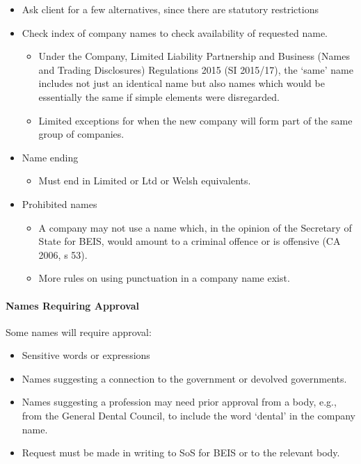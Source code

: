 \documentclass[
]{article}
\providecommand{\tightlist}{%
  \setlength{\itemsep}{0pt}\setlength{\parskip}{0pt}}
\begin{document}
\begin{itemize}
\tightlist
\item
  Ask client for a few alternatives, since there are statutory
  restrictions
\item
  Check index of company names to check availability of requested name.

  \begin{itemize}
  \tightlist
  \item
    Under the Company, Limited Liability Partnership and Business (Names
    and Trading Disclosures) Regulations 2015 (SI 2015/17), the `same'
    name includes not just an identical name but also names which would
    be essentially the same if simple elements were disregarded.
  \item
    Limited exceptions for when the new company will form part of the
    same group of companies.
  \end{itemize}
\item
  Name ending

  \begin{itemize}
  \tightlist
  \item
    Must end in Limited or Ltd or Welsh equivalents.
  \end{itemize}
\item
  Prohibited names

  \begin{itemize}
  \tightlist
  \item
    A company may not use a name which, in the opinion of the Secretary
    of State for BEIS, would amount to a criminal offence or is
    offensive (CA 2006, s 53).
  \item
    More rules on using punctuation in a company name exist.
  \end{itemize}
\end{itemize}

\hypertarget{names-requiring-approval}{%
\paragraph{Names Requiring Approval}\label{names-requiring-approval}}

Some names will require approval:

\begin{itemize}
\tightlist
\item
  Sensitive words or expressions
\item
  Names suggesting a connection to the government or devolved
  governments.
\item
  Names suggesting a profession may need prior approval from a body,
  e.g., from the General Dental Council, to include the word `dental' in
  the company name.
\item
  Request must be made in writing to SoS for BEIS or to the relevant
  body.
\end{itemize}
\end{document}
